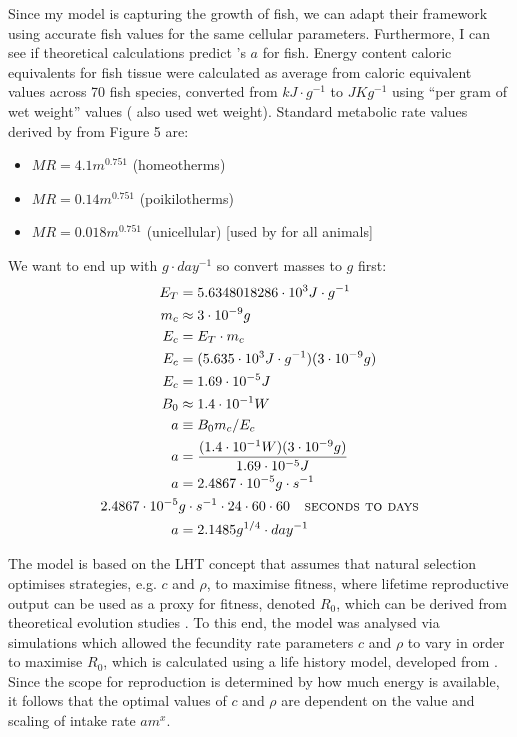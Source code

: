 \documentclass[a4paper]{article} %
\begin{document}
Since my model is capturing the growth of fish, we can adapt their framework using  accurate fish values for the same cellular parameters. Furthermore, I can see if theoretical calculations predict \cite{West2001}'s $a$ for fish. Energy content caloric equivalents for fish tissue were calculated as average from caloric equivalent values across 70 fish species, converted from $kJ\cdot g^{-1}$ to $JKg^{-1}$ using ``per gram of wet weight'' values \autocite{Steimle1980} (\cite{West2001} also used wet weight). Standard metabolic rate values derived by \cite{Hemmingsen1960} from Figure 5 are:
\begin{itemize}
    \item $MR = 4.1m^{0.751}$ (homeotherms)
    \item $MR = 0.14m^{0.751}$ (poikilotherms)
    \item $MR = 0.018m^{0.751}$ (unicellular) [used by \cite{West2001} for all animals]
\end{itemize}

We want to end up with $g\cdot day^{-1}$ so convert masses to $g$ first:
\begin{align*}
    E_T &= 5.6348018286 \cdot 10^3 J\cdot g^{-1} \\
    m_c &\approx 3 \cdot 10^{-9} g \\
    E_c &= E_T \cdot m_c \\
    E_c &= (5.635 \cdot 10^3 J\cdot g^{-1})(3 \cdot 10^{-9} g) \\
    E_c &= 1.69 \cdot 10^{-5} J \\
    B_0 &\approx 1.4 \cdot 10^{-1} W \\
    a &\equiv B_{0}m_{c}/E_{c} \\
    a &= \frac{(1.4 \cdot 10^{-1} W)(3 \cdot 10^{-9} g)}{1.69 \cdot 10^{-5} J}\\
    a &= 2.4867 \cdot 10^{-5}g\cdot s^{-1} \\
    2.4867 \cdot 10^{-5}&g\cdot s^{-1} \cdot 24 \cdot 60 \cdot 60 \ \ \textsc{   seconds to days}\\
    a &= 2.1485 g^{1/4}\cdot day^{-1}
\end{align*}




The model is based on the LHT concept that assumes that natural selection optimises strategies, e.g. $c$ and $\rho$, to maximise fitness, where lifetime reproductive output can be used as a proxy for fitness, denoted $R_0$, which can be derived from theoretical evolution studies \autocite{Charnov2001, stearns1992evolution}. To this end, the model was analysed via simulations which allowed the fecundity rate parameters $c$ and $\rho$ to vary in order to maximise $R_0$, which is calculated using a life history model, developed from \cite{Charnov2001}. Since the scope for reproduction is determined by how much energy is available, it follows that the optimal values of $c$ and $\rho$ are dependent on the value and scaling of intake rate $am^{x}$. 
\end{document}
